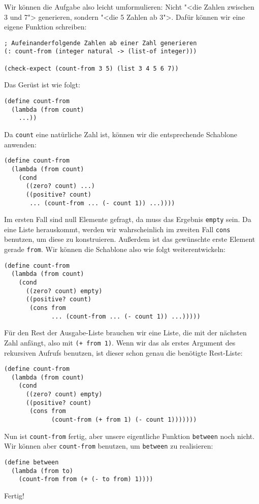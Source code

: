 Wir können die Aufgabe also leicht umformulieren: Nicht "<die Zahlen
zwischen 3 und 7"> generieren, sondern "<die 5 Zahlen ab 3">.  Dafür
können wir eine eigene Funktion schreiben:
%
\begin{lstlisting}
; Aufeinanderfolgende Zahlen ab einer Zahl generieren
(: count-from (integer natural -> (list-of integer)))

(check-expect (count-from 3 5) (list 3 4 5 6 7))
\end{lstlisting}
%
Das Gerüst ist wie folgt:
%
\begin{lstlisting}
(define count-from
  (lambda (from count)
    ...))
\end{lstlisting}
%
Da \lstinline{count} eine natürliche Zahl ist, können wir die
entsprechende Schablone anwenden:
%
\begin{lstlisting}
(define count-from
  (lambda (from count)
    (cond
      ((zero? count) ...)
      ((positive? count)
       ... (count-from ... (- count 1)) ...))))
\end{lstlisting}
%
Im ersten Fall sind null Elemente gefragt, da muss das Ergebnis
\lstinline{empty} sein.  Da eine Liste herauskommt, werden wir
wahrscheinlich im zweiten Fall \lstinline{cons} benutzen, um diese zu
konstruieren.  Außerdem ist das gewünschte erste Element gerade
\lstinline{from}.  Wir können die Schablone also wie folgt
weiterentwickeln:
%
\begin{lstlisting}
(define count-from
  (lambda (from count)
    (cond
      ((zero? count) empty)
      ((positive? count)
       (cons from
             ... (count-from ... (- count 1)) ...)))))
\end{lstlisting}
%
Für den Rest der Ausgabe-Liste brauchen wir eine Liste, die mit der
nächsten Zahl anfängt, also mit \lstinline{(+ from 1)}.  Wenn wir das
als erstes Argument des rekursiven Aufrufs benutzen, ist dieser schon
genau die benötigte Rest-Liste:
%
\begin{lstlisting}
(define count-from
  (lambda (from count)
    (cond
      ((zero? count) empty)
      ((positive? count)
       (cons from
             (count-from (+ from 1) (- count 1)))))))
\end{lstlisting}
%
Nun ist \lstinline{count-from} fertig, aber unsere eigentliche Funktion
\lstinline{between} noch nicht.  Wir können aber \lstinline{count-from}
benutzen, um \lstinline{between} zu realisieren:
%
\begin{lstlisting}
(define between
  (lambda (from to)
    (count-from from (+ (- to from) 1))))
\end{lstlisting}
%
Fertig!

